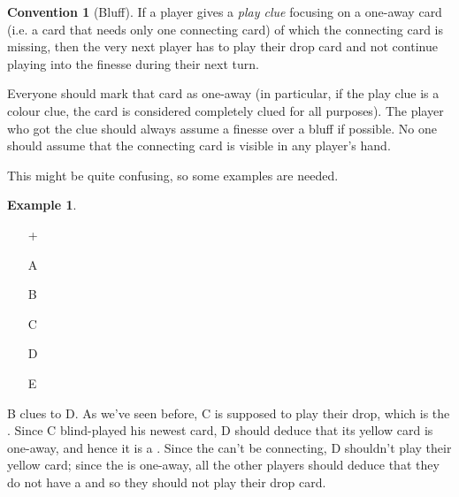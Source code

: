 \documentclass[a4paper]{article}
\theoremstyle{plain}
\theoremstyle{definition}
\newtheorem{example}[theorem]{Example}
\newtheorem{convention}[theorem]{Convention}
\begin{document}
\begin{convention}[Bluff]
	\label{bluff}
	If a player gives a \emph{play clue} focusing on a one-away card (i.e. a card that needs only one connecting card) of which the connecting card is missing, then the very next player has to play their drop card and not continue playing into the finesse during their next turn.
	
	Everyone should mark that card as one-away (in particular, if the play clue is a colour clue, the card is considered completely clued for all purposes). The player who got the clue should always assume a finesse over a bluff if possible. No one should assume that the connecting card is visible in any player's hand.
\end{convention}

This might be quite confusing, so some examples are needed.

\begin{example}
	\label{ex:bluff}
	\hfill \\
	\begin{minipage}{0.45\textwidth}
		\begin{itemize}
			\item[\Large +]      
			\item[\Large A]    
			\item[\Large B]    
			\item[\Large C]    
			\item[\Large D]    
			\item[\Large E]    
		\end{itemize}
	\end{minipage}%
	\begin{minipage}{0.55\textwidth}
		B clues  to D. As we've seen before, C is supposed to play their drop, which is the . Since C blind-played his newest card, D should deduce that its yellow card is one-away, and hence it is a . Since the  can't be connecting, D shouldn't play their yellow card; since the  is one-away, all the other players should deduce that they do not have a  and so they should not play their drop card.
	\end{minipage}
\end{example} \vspace{0.15 cm}
\end{document}
